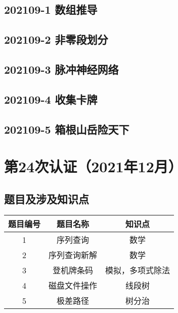 \documentclass[cn,10pt,math=newtx,citestyle=gb7714-2015,bibstyle=gb7714-2015]{elegantbook}
\newif\ifonlyanalyze %
\begin{document}
\newpage
\section{202109-1 数组推导}
\ifonlyanalyze
\else
  
\fi


\newpage
\section{202109-2 非零段划分}
\ifonlyanalyze
\else
  
\fi


\newpage
\section{202109-3 脉冲神经网络}
\ifonlyanalyze
\else
  
\fi


\newpage
\section{202109-4 收集卡牌}
\ifonlyanalyze
\else
  
\fi


\newpage
\section{202109-5 箱根山岳险天下}
\ifonlyanalyze
\else
  
\fi



\chapter{第24次认证（2021年12月）}

\section{题目及涉及知识点}

\begin{table}[htbp]
  \centering
  \begin{tabular}{ccc}
    \toprule
    题目编号 & 题目名称     & 知识点           \\
    \midrule
    1        & 序列查询     & 数学             \\
    2        & 序列查询新解 & 数学             \\
    3        & 登机牌条码   & 模拟，多项式除法 \\
    4        & 磁盘文件操作 & 线段树           \\
    5        & 极差路径     & 树分治           \\
    \bottomrule
  \end{tabular}
\end{table}
\end{document}
